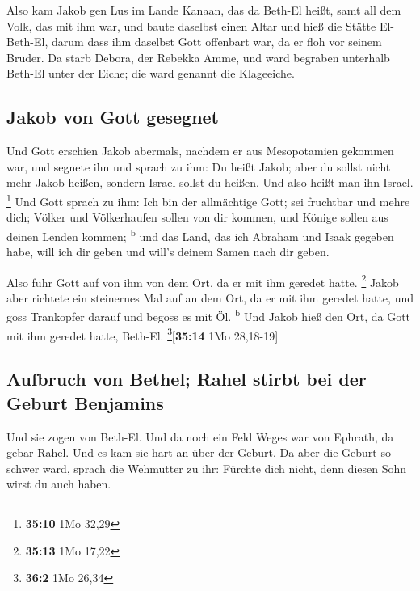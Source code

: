  Also kam Jakob gen Lus im Lande Kanaan, das da Beth-El
heißt, samt all dem Volk, das mit ihm war,  und baute
daselbst einen Altar und hieß die Stätte El-Beth-El, darum dass ihm
daselbst Gott offenbart war, da er floh vor seinem Bruder.
 Da starb Debora, der Rebekka Amme, und ward begraben
unterhalb Beth-El unter der Eiche; die ward genannt die Klageeiche.

\hypertarget{jakob-von-gott-gesegnet}{%
\subsection{Jakob von Gott gesegnet}\label{jakob-von-gott-gesegnet}}

 Und Gott erschien Jakob abermals, nachdem er aus
Mesopotamien gekommen war, und segnete ihn  und sprach zu
ihm: Du heißt Jakob; aber du sollst nicht mehr Jakob heißen, sondern
Israel sollst du heißen. Und also heißt man ihn Israel. \footnote{\textbf{35:10}
  1Mo 32,29}  Und Gott sprach zu ihm: Ich bin der
allmächtige Gott; sei fruchtbar und mehre dich; Völker und Völkerhaufen
sollen von dir kommen, und Könige sollen aus deinen Lenden kommen;
\textsuperscript{b}  und das Land, das ich Abraham und
Isaak gegeben habe, will ich dir geben und will's deinem Samen nach dir
geben.

 Also fuhr Gott auf von ihm von dem Ort, da er mit ihm
geredet hatte. \footnote{\textbf{35:13} 1Mo 17,22}  Jakob
aber richtete ein steinernes Mal auf an dem Ort, da er mit ihm geredet
hatte, und goss Trankopfer darauf und begoss es mit Öl.
\textsuperscript{b}  Und Jakob hieß den Ort, da Gott mit
ihm geredet hatte, Beth-El. \footnote{\textbf{36:2} 1Mo 26,34}{[}\textbf{35:14}
1Mo 28,18-19{]}

\hypertarget{aufbruch-von-bethel-rahel-stirbt-bei-der-geburt-benjamins}{%
\subsection{Aufbruch von Bethel; Rahel stirbt bei der Geburt
Benjamins}\label{aufbruch-von-bethel-rahel-stirbt-bei-der-geburt-benjamins}}

 Und sie zogen von Beth-El. Und da noch ein Feld Weges
war von Ephrath, da gebar Rahel.  Und es kam sie hart an
über der Geburt. Da aber die Geburt so schwer ward, sprach die Wehmutter
zu ihr: Fürchte dich nicht, denn diesen Sohn wirst du auch haben.

